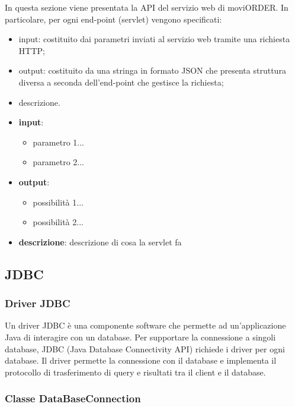 In questa sezione viene presentata la API del servizio web di moviORDER. In particolare, per ogni end-point (servlet) vengono specificati:
\begin{itemize}
	\item input: costituito dai parametri inviati al servizio web tramite una richiesta HTTP;
	\item output: costituito da una stringa in formato JSON che presenta struttura diversa a seconda dell'end-point che gestisce la richiesta;
	\item descrizione.
\end{itemize}


\begin{itemize}
	\item \textbf{input}:
		\begin{itemize}
			\item parametro 1...
			\item parametro 2...
		\end{itemize}
	\item \textbf{output}:
		\begin{itemize}
			\item possibilità 1...
			\item possibilità 2...
		\end{itemize}
	\item \textbf{descrizione}: descrizione di cosa la servlet fa
\end{itemize}

\subsection{JDBC}

\subsubsection{Driver JDBC}

Un driver JDBC è una componente software che permette ad un'applicazione Java di interagire con un database. Per supportare la connessione a singoli database, JDBC (Java Database Connectivity API) richiede i driver per ogni database. Il driver permette la connessione con il database e implementa il protocollo di trasferimento di query e risultati tra il client e il database.

\subsubsection{Classe DataBaseConnection}

